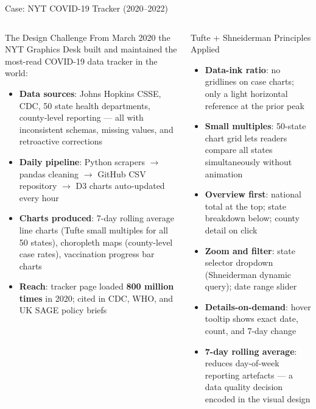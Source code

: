 \documentclass[aspectratio=169,10pt]{beamer}
\begin{document}
\begin{frame}{Case: NYT COVID-19 Tracker (2020--2022)}
  \begin{columns}[T]
      \begin{block}{The Design Challenge}
        From March 2020 the NYT Graphics Desk built and maintained
        the most-read COVID-19 data tracker in the world:
        \begin{itemize}
          \item \textbf{Data sources}: Johns Hopkins CSSE, CDC,
                50 state health departments, county-level reporting
                — all with inconsistent schemas, missing values, and
                retroactive corrections
          \item \textbf{Daily pipeline}: Python scrapers
                $\to$ pandas cleaning $\to$ GitHub CSV repository
                $\to$ D3 charts auto-updated every hour
          \item \textbf{Charts produced}: 7-day rolling average line
                charts (Tufte small multiples for all 50 states),
                choropleth maps (county-level case rates),
                vaccination progress bar charts
          \item \textbf{Reach}: tracker page loaded
                \textbf{800 million times} in 2020;
                cited in CDC, WHO, and UK SAGE policy briefs
        \end{itemize}
      \end{block}

      \begin{block}{Tufte + Shneiderman Principles Applied}
        \begin{itemize}
          \item \textbf{Data-ink ratio}: no gridlines on case charts;
                only a light horizontal reference at the prior peak
          \item \textbf{Small multiples}: 50-state chart grid lets
                readers compare all states simultaneously without
                animation
          \item \textbf{Overview first}: national total at the top;
                state breakdown below; county detail on click
          \item \textbf{Zoom and filter}: state selector dropdown
                (Shneiderman dynamic query); date range slider
          \item \textbf{Details-on-demand}: hover tooltip shows
                exact date, count, and 7-day change
          \item \textbf{7-day rolling average}: reduces day-of-week
                reporting artefacts — a data quality decision
                encoded in the visual design
        \end{itemize}
      \end{block}
  \end{columns}
\end{frame}
\end{document}

